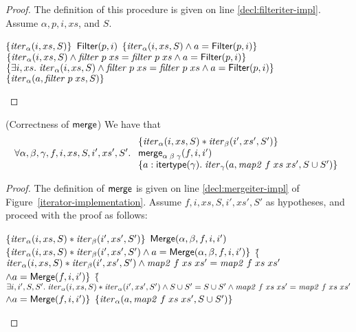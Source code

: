 \begin{proof}
The definition of this procedure is given on line \ref{decl:filteriter-impl}. Assume
$\alpha, p, i, xs$, and $S$. 

\begin{specification}
\nextline $\{{\mathit{iter}_\alpha(i, xs, S)}\}$ 
\nextline $\mathsf{Filter}(p, i)$ 
\nextline $\{{\mathit{iter}_\alpha(i, xs, S) \land a = \mathsf{Filter}(p, i)}\}$ 
\nextline $\{{\mathit{iter}_\alpha(i, xs, S) \land \mathit{filter}\;p\;xs = \mathit{filter}\;p\;xs \land a = \mathsf{Filter}(p, i)}\}$ 
\nextline $\{{\exists i, xs.\; \mathit{iter}_\alpha(i, xs, S) \land \mathit{filter}\;p\;xs = \mathit{filter}\;p\;xs \land a = \mathsf{Filter}(p, i)}\}$
\nextline $\{{\mathit{iter}_\alpha(a, \mathit{filter}\;p\;xs, S)}\}$ 
\end{specification}
\end{proof}

\begin{lemma}{(Correctness of $\mathsf{merge}$)}
We have that 
\begin{displaymath}
  \forall \alpha, \beta, \gamma, f, i, xs, S, i', xs', S'.\; 
  \begin{array}{l}
    \{{\mathit{iter}_\alpha(i, xs, S) * \mathit{iter}_\beta(i',xs',S')}\} \\
    \mathsf{merge}_{\alpha\;\beta\;\gamma}(f, i, i') \\
    \{{a:\mathsf{itertype}(\gamma).\; \mathit{iter}_\gamma(a, \mathit{map2}\;f\;xs\;xs', S \cup S')}\}\\
  \end{array}
\end{displaymath}
\end{lemma}

\begin{proof}
The definition of $\mathsf{merge}$ is given on line \ref{decl:mergeiter-impl} of
Figure~\ref{iterator-implementation}. Assume $f, i, xs, S, i', xs', S'$ as 
hypotheses, and proceed with the proof as follows: 

\begin{specification}
\nextline $\{{\mathit{iter}_\alpha(i, xs, S) * \mathit{iter}_\beta(i',xs',S')}\}$ 
\nextline $\mathsf{Merge}(\alpha, \beta, f, i, i')$
\nextline $\{{\mathit{iter}_\alpha(i, xs, S) * \mathit{iter}_\beta(i',xs',S')  \land a = \mathsf{Merge}(\alpha, \beta, f, i, i')}\}$ 
\nextline $\{$\=$\mathit{iter}_\alpha(i, xs, S) * \mathit{iter}_\beta(i',xs',S')  \land \mathit{map2}\;f\;xs\;xs' = \mathit{map2}\;f\;xs\;xs'$
\nextline \> $\land a = \mathsf{Merge}(f, i, i')\}$ 
\nextline $\{$\=$\exists i, i', S, S'.\; \mathit{iter}_\alpha(i, xs, S) * \mathit{iter}_\alpha(i',xs',S') \land S \cup S' = S \cup S' \land \mathit{map2}\;f\;xs\;xs' = \mathit{map2}\;f\;xs\;xs'$ 
\nextline \> $\land a = \mathsf{Merge}(f, i, i')\}$ 
\nextline $\{{\mathit{iter}_\alpha(a, \mathit{map2}\;f\;xs\;xs', S \cup S')}\}$
\end{specification}
\end{proof}

